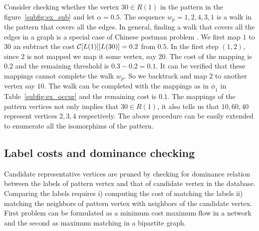 Consider checking whether the vertex $30 \in R(1)$ 
in the pattern in the figure~\ref{subfig:ex_sub} and let $\alpha = 0.5$. The
sequence $w_p = 1, 2, 4, 3, 1$ is a walk in the pattern that covers all the edges.
In general, finding a walk that covers all the edges in a graph is a special
case of Chinese postman problem \cite{chinesepostman}. We first map $1$ to $30$
an subtract the cost $\mathcal{C}[L(1)][L(30)] = 0.2$ from $0.5$. In the first
step $(1,2)$, since $2$ is not mapped we map it some vertex, say $20$. The cost
of the mapping is $0.2$ and the remaining threshold is $0.3 -0.2 = 0.1$. It can
be verified that these mappings cannot complete the walk $w_p$. So we backtrack 
and map $2$ to another vertex say $10$. The walk can be completed with the
mappings as in $\phi_1$ in Table~\ref{subfig:ex_occur} and the remaining cost is 
$0.1$. The mappings of the pattern vertices not only implies that $30 \in R(1)$,
it also tells us that $10, 60, 40$ represent vertices $2, 3, 4$ respectively.
The above procedure can be easily extended to enumerate all the isomorphims of the
pattern.



\subsection{Label costs and dominance checking} \label{sec:labelcheck} 
Candidate representative vertices are pruned by checking for dominance 
relation between the \ncl labels of pattern vertex and that of candidate
vertex in the database. Comparing the \ncl labels requires i) computing the
cost of matching the \khop labels ii) matching the neighbors of pattern vertex 
with neighbors of the candidate vertex. First problem can be formulated
as a minimum cost maximum flow in a network and the second as maximum matching
in a bipartite graph.

